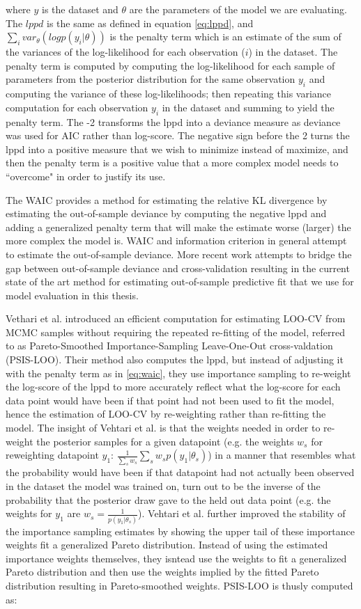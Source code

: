 where $y$ is the dataset and $\theta$ are the parameters of the model we are evaluating. The $lppd$ is the same as defined in equation \ref{eq:lppd}, and $\sum_i var_{\theta}(logp(y_i|\theta))$ is the penalty term which is an estimate of the sum of the variances of the log-likelihood for each observation ($i$) in the dataset. The penalty term is computed by computing the log-likelihood for each sample of parameters from the posterior distribution for the same observation $y_i$ and computing the variance of these log-likelihoods; then repeating this variance computation for each observation $y_i$ in the dataset and summing to yield the penalty term. The -2 transforms the lppd into a deviance measure as deviance was used for AIC rather than log-score. The negative sign before the 2 turns the lppd into a positive measure that we wish to minimize instead of maximize, and then the penalty term is a positive value that a more complex model needs to ``overcome" in order to justify its use.

The WAIC provides a method for estimating the relative KL divergence by estimating the out-of-sample deviance by computing the negative lppd and adding a generalized penalty term that will make the estimate worse (larger) the more complex the model is. WAIC and information criterion in general attempt to estimate the out-of-sample deviance. More recent work attempts to bridge the gap between out-of-sample deviance and cross-validation resulting in the current state of the art method for estimating out-of-sample predictive fit that we use for model evaluation in this thesis.

Vethari et al. \cite{Vehtari2016} introduced an efficient computation for estimating LOO-CV from MCMC samples without requiring the repeated re-fitting of the model, referred to as Pareto-Smoothed Importance-Sampling Leave-One-Out cross-valdation (PSIS-LOO). Their method also computes the lppd, but instead of adjusting it with the penalty term as in \ref{eq:waic}, they use importance sampling to re-weight the log-score of the lppd to more accurately reflect what the log-score for each data point would have been if that point had not been used to fit the model, hence the estimation of LOO-CV by re-weighting rather than re-fitting the model. The insight of Vehtari et al. is that the weights needed in order to re-weight the posterior samples for a given datapoint (e.g. the weights $w_s$ for reweighting datapoint $y_1$: $\frac{1}{\sum_s w_s} \sum_s w_s p(y_1 | \theta_s)$) in a manner that resembles what the probability would have been if that datapoint had not actually been observed in the dataset the model was trained on, turn out to be the inverse of the probability that the posterior draw gave to the held out data point (e.g. the weights for $y_1$ are $w_s = \frac{1}{p(y_1|\theta_s)}$). Vehtari et al. further improved the stability of the importance sampling estimates by showing the upper tail of these importance weights fit a generalized Pareto distribution. Instead of using the estimated importance weights themselves, they isntead use the weights to fit a generalized Pareto distribution and then use the weights implied by the fitted Pareto distribution resulting in Pareto-smoothed weights. PSIS-LOO is thusly computed as:

